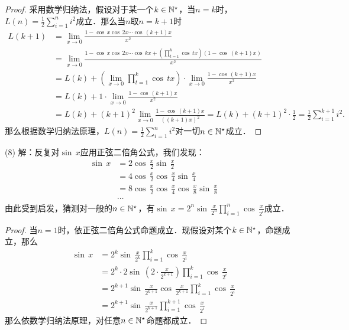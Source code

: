 \begin{proof}
采用数学归纳法，假设对于某一个$k \in \mathbb{N}^\star$，当$n=k$时，$L(n) = \displaystyle\frac{1}{2} \sum_{i=1}^n i^2$成立．那么当$n$取$n=k+1$时
\begin{align}
    L(k+1) &= \lim_{x \to 0} \frac{1-\cos \, x \cos \, 2x \cdots \cos \, (k+1)x}{x^2} \\
    &= \lim_{x \to 0} \frac{1-\cos \, x \cos \, 2x \cdots \cos \, kx + \left(\displaystyle\prod_{t=1}^{k} \cos \, tx \right)\left(1-\cos \, (k+1)x\right)}{x^2} \\
    &= L(k) + \left(\lim_{x \to 0} \displaystyle\prod_{t=1}^{k} \cos \, tx \right) \cdot \lim_{x \to 0} \frac{1-\cos \, (k+1)x}{x^2} \\
    &= L(k) + 1 \cdot \lim_{x \to 0} \frac{1-\cos \, (k+1)x}{x^2} \\
    &= L(k) + (k+1)^2 \lim_{x \to 0} \frac{1-\cos \, (k+1)x}{((k+1)x)^2} = L(k) + (k+1)^2 \cdot \frac{1}{2} = \frac{1}{2} \sum_{i=1}^{k+1} i^2.
\end{align}
那么根据数学归纳法原理，$L(n) = \displaystyle\frac{1}{2}\displaystyle\sum_{i=1}^n i^2$对一切$n \in \mathbb{N}^\star$成立．
\end{proof}

(8) 解：反复对$\sin \, x$应用正弦二倍角公式，我们发现：
\begin{align}
    \sin \, x & = 2 \cos \, \frac{x}{2} \sin \, \frac{x}{2} \\
    &= 4 \cos \, \frac{x}{2} \cos \, \frac{x}{4} \sin \, \frac{x}{4} \\
    &= 8 \cos \, \frac{x}{2} \cos \, \frac{x}{4} \cos \, \frac{x}{8} \sin \, \frac{x}{8} \\
    &\cdots
\end{align}
由此受到启发，猜测对一般的$n \in \mathbb{N}^\star$，有$\sin \, x = 2^n \sin \, \displaystyle\frac{x}{2^n} \displaystyle\prod_{i=1}^n \cos \, \displaystyle\frac{x}{2^i}$成立．
\begin{proof}
当$n=1$时，依正弦二倍角公式命题成立．现假设对某个$k \in \mathbb{N}^\star$，命题成立，那么
\begin{align}
    \sin \, x &= 2^{k} \sin \, \displaystyle\frac{x}{2^k} \prod_{i=1}^k \cos \, \frac{x}{2^i} \\
    &= 2^{k} \cdot 2 \sin \, \left( 2 \cdot \frac{x}{2^{k+1}} \right) \prod_{i=1}^k \cos \, \frac{x}{2^i} \\
    &= 2^{k+1} \sin \, \frac{x}{2^{k+1}} \cos \, \frac{x}{2^{k+1}} \prod_{i=1}^{k} \cos \, \frac{x}{2^i} \\
    &= 2^{k+1} \sin \, \frac{x}{2^{k+1}} \prod_{i=1}^{k+1} \cos \, \frac{x}{2^{i}}
\end{align}
那么依数学归纳法原理，对任意$n \in \mathbb{N}^\star$命题都成立．
\end{proof}

